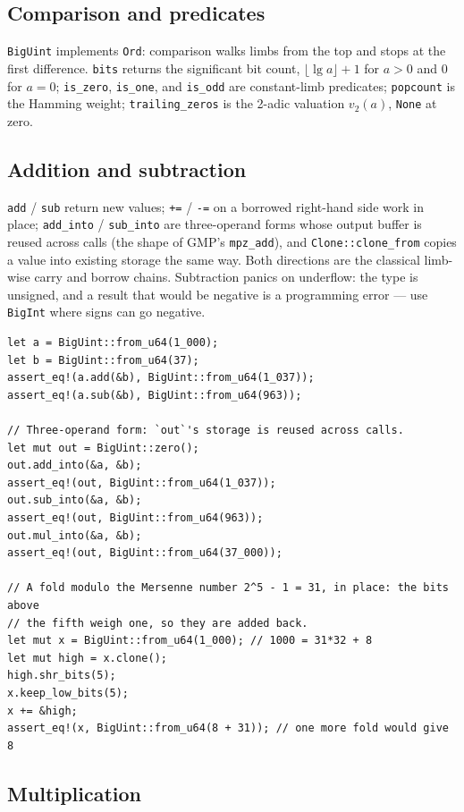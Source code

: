 \documentclass[11pt]{article}
\newcommand{\code}[1]{\texttt{#1}}
\begin{document}
\subsection{Comparison and predicates}

\code{BigUint} implements \code{Ord}: comparison walks limbs from the top
and stops at the first difference. \code{bits} returns the significant bit
count, $\lfloor \lg a \rfloor + 1$ for $a > 0$ and $0$ for $a = 0$;
\code{is\_zero}, \code{is\_one}, and \code{is\_odd} are constant-limb
predicates; \code{popcount} is the Hamming weight; \code{trailing\_zeros}
is the 2-adic valuation $v_2(a)$, \code{None} at zero.

\subsection{Addition and subtraction}

\code{add} / \code{sub} return new values; \code{+=} / \code{-=} on a
borrowed right-hand side work in place; \code{add\_into} / \code{sub\_into}
are three-operand forms whose output buffer is reused across calls (the
shape of GMP's \code{mpz\_add}), and \code{Clone::clone\_from} copies a value
into existing storage the same way. Both directions are the
classical limb-wise carry and borrow chains. Subtraction panics on
underflow: the type is unsigned, and a result that would be negative is a
programming error --- use \code{BigInt} where signs can go negative.

\begin{lstlisting}
let a = BigUint::from_u64(1_000);
let b = BigUint::from_u64(37);
assert_eq!(a.add(&b), BigUint::from_u64(1_037));
assert_eq!(a.sub(&b), BigUint::from_u64(963));

// Three-operand form: `out`'s storage is reused across calls.
let mut out = BigUint::zero();
out.add_into(&a, &b);
assert_eq!(out, BigUint::from_u64(1_037));
out.sub_into(&a, &b);
assert_eq!(out, BigUint::from_u64(963));
out.mul_into(&a, &b);
assert_eq!(out, BigUint::from_u64(37_000));

// A fold modulo the Mersenne number 2^5 - 1 = 31, in place: the bits above
// the fifth weigh one, so they are added back.
let mut x = BigUint::from_u64(1_000); // 1000 = 31*32 + 8
let mut high = x.clone();
high.shr_bits(5);
x.keep_low_bits(5);
x += &high;
assert_eq!(x, BigUint::from_u64(8 + 31)); // one more fold would give 8
\end{lstlisting}

\subsection{Multiplication}
\label{sec:mul}
\end{document}

